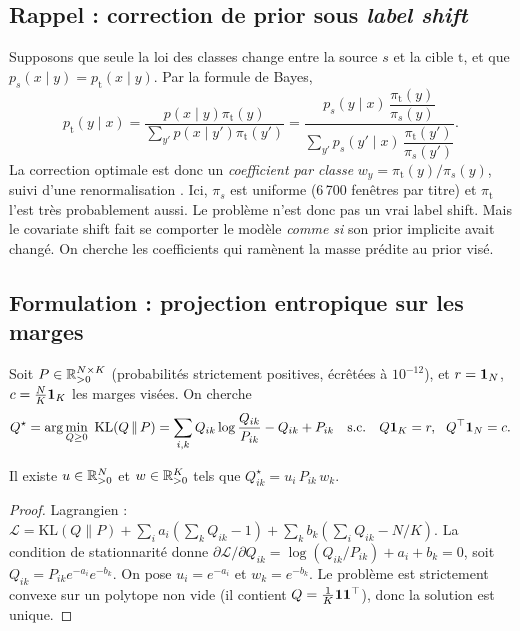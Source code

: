 \subsection{Rappel : correction de prior sous \emph{label shift}}
Supposons que seule la loi des classes change entre la source $s$ et la cible $\mathrm{t}$, et que $p_s(x\mid y)=p_{\mathrm{t}}(x\mid y)$. Par la formule de Bayes,
\begin{equation}
p_{\mathrm{t}}(y\mid x)=\frac{p(x\mid y)\pi_{\mathrm{t}}(y)}{\sum_{y'}p(x\mid y')\pi_{\mathrm{t}}(y')}
=\frac{p_s(y\mid x)\,\dfrac{\pi_{\mathrm{t}}(y)}{\pi_s(y)}}{\sum_{y'}p_s(y'\mid x)\,\dfrac{\pi_{\mathrm{t}}(y')}{\pi_s(y')}} .
\label{eq:labelshift}
\end{equation}
La correction optimale est donc un \emph{coefficient par classe} $w_y=\pi_{\mathrm{t}}(y)/\pi_s(y)$, suivi d'une renormalisation \cite{saerens,lipton}. Ici, $\pi_s$ est uniforme (6\,700 fenêtres par titre) et $\pi_{\mathrm{t}}$ l'est très probablement aussi. Le problème n'est donc pas un vrai label shift. Mais le covariate shift fait se comporter le modèle \emph{comme si} son prior implicite avait changé. On cherche les coefficients qui ramènent la masse prédite au prior visé.

\subsection{Formulation : projection entropique sur les marges}
Soit $P\in\mathbb{R}_{>0}^{N\times K}$ (probabilités strictement positives, écrêtées à $10^{-12}$), et $r=\mathbf{1}_N$, $c=\frac NK\mathbf{1}_K$ les marges visées. On cherche
\begin{equation}
Q^\star=\arg\min_{Q\ge0}\ \mathrm{KL}(Q\,\|\,P)=\sum_{i,k}Q_{ik}\log\frac{Q_{ik}}{P_{ik}}-Q_{ik}+P_{ik}
\quad\text{s.c.}\quad Q\1_K=r,\ \ Q^\top\1_N=c .
\label{eq:kl}
\end{equation}
\begin{proposition}\label{prop:sinkform}
Il existe $u\in\mathbb{R}^N_{>0}$ et $w\in\mathbb{R}^K_{>0}$ tels que $Q^\star_{ik}=u_i\,P_{ik}\,w_k$.
\end{proposition}
\begin{proof}
Lagrangien : $\mathcal{L}=\mathrm{KL}(Q\|P)+\sum_i a_i(\sum_kQ_{ik}-1)+\sum_kb_k(\sum_iQ_{ik}-N/K)$. La condition de stationnarité donne $\partial\mathcal{L}/\partial Q_{ik}=\log(Q_{ik}/P_{ik})+a_i+b_k=0$, soit $Q_{ik}=P_{ik}e^{-a_i}e^{-b_k}$. On pose $u_i=e^{-a_i}$ et $w_k=e^{-b_k}$. Le problème est strictement convexe sur un polytope non vide (il contient $Q=\frac1K\mathbf{1}\mathbf{1}^\top$), donc la solution est unique.
\end{proof}

